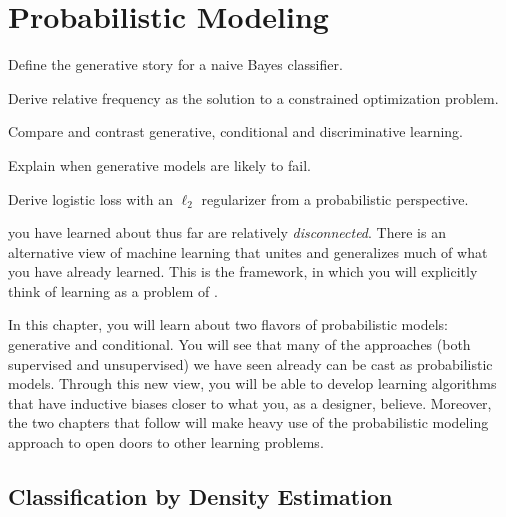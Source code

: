 \chapter{Probabilistic Modeling} \label{sec:prob}


\begin{learningobjectives}
\item Define the generative story for a naive Bayes classifier.
\item Derive relative frequency as the solution to a constrained
  optimization problem.
\item Compare and contrast generative, conditional and discriminative
  learning.
\item Explain when generative models are likely to fail.
\item Derive logistic loss with an $\ell_2$ regularizer from a
  probabilistic perspective.
\end{learningobjectives}

\dependencies{}

 you have learned about
thus far are relatively \emph{disconnected}.  There is an alternative
view of machine learning that unites and generalizes much of what you
have already learned.  This is the 
framework, in which you will explicitly think of learning as a problem
of .

In this chapter, you will learn about two flavors of probabilistic
models: generative and conditional.  You will see that many of the
approaches (both supervised and unsupervised) we have seen already can
be cast as probabilistic models.  Through this new view, you will be
able to develop learning algorithms that have inductive biases closer
to what you, as a designer, believe.  Moreover, the two chapters that
follow will make heavy use of the probabilistic modeling approach to
open doors to other learning problems.

\section{Classification by Density Estimation}

